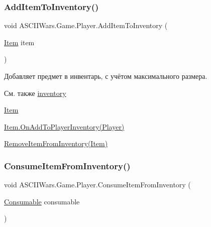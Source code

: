 \subsubsection{\texorpdfstring{Add\+Item\+To\+Inventory()}{AddItemToInventory()}}
{\footnotesize\ttfamily void A\+S\+C\+I\+I\+Wars.\+Game.\+Player.\+Add\+Item\+To\+Inventory (\begin{DoxyParamCaption}\item[{\hyperlink{class_a_s_c_i_i_wars_1_1_game_1_1_item}{Item}}]{item }\end{DoxyParamCaption})\hspace{0.3cm}{\ttfamily [inline]}}



Добавляет предмет в инвентарь, с учётом максимального размера. 

\begin{DoxySeeAlso}{См. также}
\hyperlink{class_a_s_c_i_i_wars_1_1_game_1_1_player_a04acfaa196162f89bfae7aee5ec45480}{inventory} 

\hyperlink{class_a_s_c_i_i_wars_1_1_game_1_1_item}{Item} 

\hyperlink{class_a_s_c_i_i_wars_1_1_game_1_1_item_aec0355b7a9f647ef24897b95563f70d1}{Item.\+On\+Add\+To\+Player\+Inventory(\+Player)} 

\hyperlink{class_a_s_c_i_i_wars_1_1_game_1_1_player_aa58a605f6337c385f4023ea842f6c246}{Remove\+Item\+From\+Inventory(\+Item)} 
\end{DoxySeeAlso}
\hypertarget{class_a_s_c_i_i_wars_1_1_game_1_1_player_ac1b40c126e1d9ec4f45f7831a86497ba}{}\label{class_a_s_c_i_i_wars_1_1_game_1_1_player_ac1b40c126e1d9ec4f45f7831a86497ba} 
\subsubsection{\texorpdfstring{Consume\+Item\+From\+Inventory()}{ConsumeItemFromInventory()}}
{\footnotesize\ttfamily void A\+S\+C\+I\+I\+Wars.\+Game.\+Player.\+Consume\+Item\+From\+Inventory (\begin{DoxyParamCaption}\item[{\hyperlink{class_a_s_c_i_i_wars_1_1_game_1_1_consumable}{Consumable}}]{consumable }\end{DoxyParamCaption})\hspace{0.3cm}{\ttfamily [inline]}}



